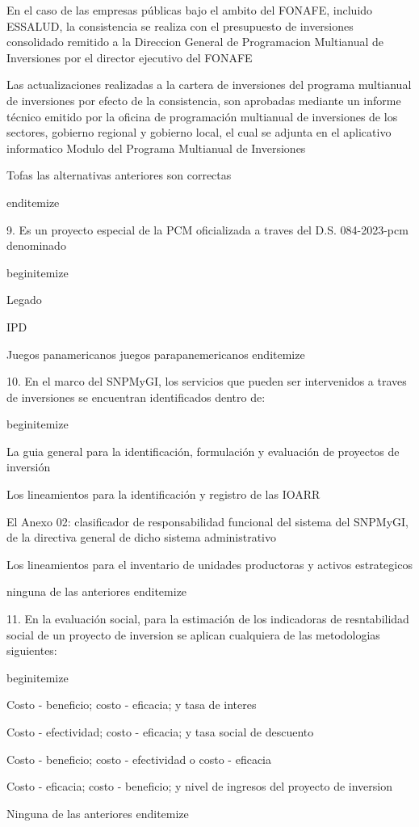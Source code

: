 				\item En el caso de las empresas públicas bajo el ambito del FONAFE, incluido ESSALUD, la consistencia se realiza con el presupuesto de inversiones consolidado remitido a la Direccion General de Programacion Multianual de Inversiones por el director ejecutivo del FONAFE
				\item Las actualizaciones realizadas a la cartera de inversiones del programa multianual de inversiones por efecto de la consistencia, son aprobadas mediante un informe técnico emitido por la oficina de programación multianual de inversiones de los sectores, gobierno regional y gobierno local, el cual se adjunta en el aplicativo informatico Modulo del Programa Multianual de Inversiones
				\item Tofas las alternativas anteriores son correctas 


end{itemize}

9. Es un proyecto especial de la PCM oficializada a traves del D.S. 084-2023-pcm denominado

begin{itemize}
			\item Legado
 			\item IPD
			\item Juegos panamericanos juegos parapanemericanos
end{itemize}

10. En el marco del SNPMyGI, los servicios que pueden ser intervenidos a traves de inversiones se encuentran identificados dentro de:

begin{itemize}
			\item La guia general para la identificación, formulación y evaluación de proyectos de inversión 
 			\item Los lineamientos para la identificación y registro de las IOARR
			\item El Anexo 02: clasificador de responsabilidad funcional del sistema del SNPMyGI, de la directiva general de dicho sistema administrativo 
			\item Los lineamientos para el inventario de unidades productoras y activos estrategicos 
			\item ninguna de las anteriores 
end{itemize}

11. En la evaluación social, para la estimación de los indicadoras de resntabilidad social de un proyecto de inversion se aplican cualquiera de las metodologias siguientes: 

begin{itemize}
			\item Costo - beneficio; costo - eficacia; y tasa de interes
 			\item Costo - efectividad; costo - eficacia; y tasa social de descuento
			\item Costo - beneficio; costo - efectividad o costo - eficacia
			\item Costo - eficacia; costo - beneficio; y nivel de ingresos del proyecto de inversion
			\item Ninguna de las anteriores 
end{itemize}

